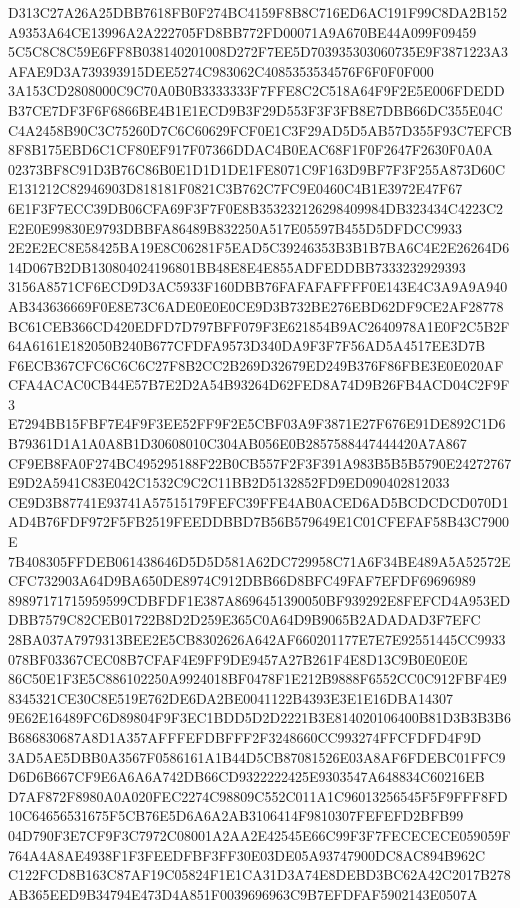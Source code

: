 \documentclass[UTF8,fontset=fandol,zihao=-4,a4paper]{ctexart}
\begin{document}
{{D313C27A26A25DBB7618FB0F274BC4159F8B8C716ED6AC191F99C8DA2B152A9353A64CE13996A2A222705FD8BB772FD00071A9A670BE44A099F09459
5C5C8C8C59E6FF8B038140201008D272F7EE5D703935303060735E9F3871223A3AFAE9D3A739393915DEE5274C983062C4085353534576F6F0F0F000
3A153CD2808000C9C70A0B0B3333333F7FFE8C2C518A64F9F2E5E006FDEDDB37CE7DF3F6F6866BE4B1E1ECD9B3F29D553F3F3FB8E7DBB66DC355E04C
C4A2458B90C3C75260D7C6C60629FCF0E1C3F29AD5D5AB57D355F93C7EFCB8F8B175EBD6C1CF80EF917F07366DDAC4B0EAC68F1F0F2647F2630F0A0A
02373BF8C91D3B76C86B0E1D1D1DE1FE8071C9F163D9BF7F3F255A873D60CE131212C82946903D818181F0821C3B762C7FC9E0460C4B1E3972E47F67
6E1F3F7ECC39DB06CFA69F3F7F0E8B353232126298409984DB323434C4223C2E2E0E99830E9793DBBFA86489B832250A517E05597B455D5DFDCC9933
2E2E2EC8E58425BA19E8C06281F5EAD5C39246353B3B1B7BA6C4E2E26264D614D067B2DB130804024196801BB48E8E4E855ADFEDDBB7333232929393
3156A8571CF6ECD9D3AC5933F160DBB76FAFAFAFFFF0E143E4C3A9A9A940AB343636669F0E8E73C6ADE0E0E0CE9D3B732BE276EBD62DF9CE2AF28778
BC61CEB366CD420EDFD7D797BFF079F3E621854B9AC2640978A1E0F2C5B2F64A6161E182050B240B677CFDFA9573D340DA9F3F7F56AD5A4517EE3D7B
F6ECB367CFC6C6C6C27F8B2CC2B269D32679ED249B376F86FBE3E0E020AFCFA4ACAC0CB44E57B7E2D2A54B93264D62FED8A74D9B26FB4ACD04C2F9F3
E7294BB15FBF7E4F9F3EE52FF9F2E5CBF03A9F3871E27F676E91DE892C1D6B79361D1A1A0A8B1D30608010C304AB056E0B2857588447444420A7A867
CF9EB8FA0F274BC495295188F22B0CB557F2F3F391A983B5B5B5790E24272767E9D2A5941C83E042C1532C9C2C11BB2D5132852FD9ED090402812033
CE9D3B87741E93741A57515179FEFC39FFE4AB0ACED6AD5BCDCDCD070D1AD4B76FDF972F5FB2519FEEDDBBD7B56B579649E1C01CFEFAF58B43C7900E
7B408305FFDEB061438646D5D5D581A62DC729958C71A6F34BE489A5A52572ECFC732903A64D9BA650DE8974C912DBB66D8BFC49FAF7EFDF69696989
89897171715959599CDBFDF1E387A8696451390050BF939292E8FEFCD4A953EDDBB7579C82CEB01722B8D2D259E365C0A64D9B9065B2ADADAD3F7EFC
28BA037A7979313BEE2E5CB8302626A642AF660201177E7E7E92551445CC9933078BF03367CEC08B7CFAF4E9FF9DE9457A27B261F4E8D13C9B0E0E0E
86C50E1F3E5C886102250A9924018BF0478F1E212B9888F6552CC0C912FBF4E98345321CE30C8E519E762DE6DA2BE0041122B4393E3E1E16DBA14307
9E62E16489FC6D89804F9F3EC1BDD5D2D2221B3E814020106400B81D3B3B3B6B686830687A8D1A357AFFFEFDBFFF2F3248660CC993274FFCFDFD4F9D
3AD5AE5DBB0A3567F0586161A1B44D5CB87081526E03A8AF6FDEBC01FFC9D6D6B667CF9E6A6A6A742DB66CD9322222425E9303547A648834C60216EB
D7AF872F8980A0A020FEC2274C98809C552C011A1C96013256545F5F9FFF8FD10C64656531675F5CB76E5D6A6A2AB3106414F9810307FEFEFD2BFB99
04D790F3E7CF9F3C7972C08001A2AA2E42545E66C99F3F7FECECECE059059F764A4A8AE4938F1F3FEEDFBF3FF30E03DE05A93747900DC8AC894B962C
C122FCD8B163C87AF19C05824F1E1CA31D3A74E8DEBD3BC62A42C2017B278AB365EED9B34794E473D4A851F0039696963C9B7EFDFAF5902143E0507A
}}
\end{document}
